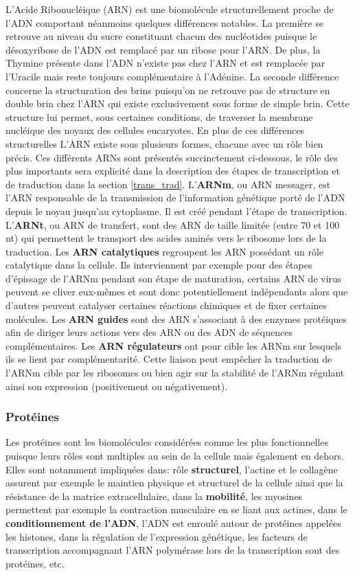 L'Acide Ribonucléique (ARN) est une biomolécule structurellement proche de l'ADN comportant néanmoins quelques différences notables. La première se retrouve au niveau du sucre constituant chacun des nucléotides puisque le désoxyribose de l'ADN est remplacé par un ribose pour l'ARN. De plus, la Thymine présente dans l'ADN n'existe pas chez l'ARN et est remplacée par l'Uracile mais reste toujours complémentaire à l'Adénine. La seconde différence concerne la structuration des brins puisqu'on ne retrouve pas de structure en double brin chez l'ARN qui existe exclusivement sous forme de simple brin. Cette structure lui permet, sous certaines conditions, de traverser la membrane nucléique des noyaux des cellules eucaryotes.
En plus de ces différences structurelles L'ARN existe sous plusieurs formes, chacune avec un rôle bien précis. Ces différents ARNs sont présentés succinctement ci-dessous, le rôle des plus importants sera explicité dans la description des étapes de transcription et de traduction dans la section \ref{trans_trad}.
L'\textbf{ARNm}, ou ARN messager, est l'ARN responsable de la transmission de l'information génétique porté de l'ADN depuis le noyau jusqu'au cytoplasme. Il est créé pendant l’étape de transcription.
L'\textbf{ARNt}, ou ARN de transfert, sont des ARN de taille limitée (entre 70 et 100 nt) qui permettent le transport des acides aminés vers le ribosome lors de la traduction.
Les \textbf{ARN catalytiques} regroupent les ARN possédant un rôle catalytique dans la cellule. Ils interviennent par exemple pour des étapes d'épissage de l'ARNm pendant son étape de maturation, certains ARN de virus peuvent se cliver eux-mêmes et sont donc potentiellement indépendants alors que d'autres peuvent catalyser certaines réactions chimiques et de fixer certaines molécules.
Les \textbf{ARN guides} sont des ARN s'associant à des enzymes protéiques afin de diriger leurs actions vers des ARN ou des ADN de séquences complémentaires.
Les \textbf{ARN régulateurs} ont pour cible les ARNm sur lesquels ils se lient par complémentarité. Cette liaison peut empêcher la traduction de l'ARNm cible par les ribosomes ou bien agir sur la stabilité de l'ARNm régulant ainsi son expression (positivement ou négativement).

\subsubsection{Protéines}

Les protéines sont les biomolécules considérées comme les plus fonctionnelles puisque leurs rôles sont multiples au sein de la cellule mais également en dehors. Elles sont notamment impliquées dans: rôle \textbf{structurel}, l'actine et le collagène assurent par exemple le maintien physique et structurel de la cellule ainsi que la résistance de la matrice extracellulaire, dans la \textbf{mobilité}, les myosines permettent par exemple la contraction musculaire en se liant aux actines, dans le \textbf{conditionnement de l'ADN}, l'ADN est enroulé autour de protéines appelées les histones, dans la régulation de l'expression génétique, les facteurs de transcription accompagnant l'ARN polymérase lors de la transcription sont des protéines, etc.

